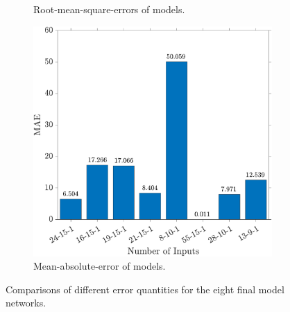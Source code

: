 \documentclass[
10pt, %
letterpaper, %
twoside, %
headinclude,footinclude, %
BCOR5mm, %
]{scrartcl}
\begin{document}
\begin{figure}[h!]
\begin{subfigure}[t]{0.49\linewidth}
		\caption{Root-mean-square-errors of models.} 
		\label{fig:RMS}
	\end{subfigure}
	\begin{subfigure}[t]{0.49\linewidth}
		\centering
		\includegraphics[width=\linewidth]{figures/MAE.pdf}
		\caption{Mean-absolute-error of models.} 
		\label{fig:MAE}
	\end{subfigure}
	\caption{Comparisons of different error quantities for the eight final model networks.}
	\label{fig:ERRORS}
\end{figure}

%
\end{document}
